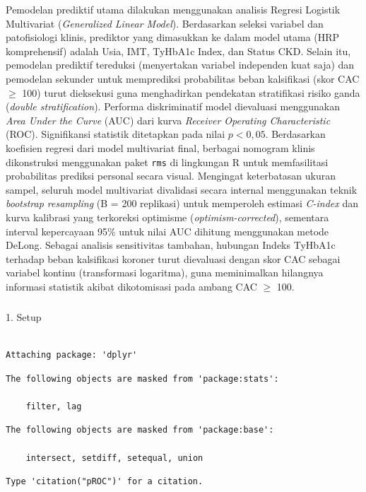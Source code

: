 \documentclass[
  indonesian,
]{agujournal2019}
\makeatletter
\let\oldsubparagraph\subparagraph
\renewcommand{\subparagraph}{
    \@ifstar
      \xxxSubParagraphStar
      \xxxSubParagraphNoStar
  }
\newcommand{\xxxSubParagraphStar}[1]{\oldsubparagraph*{#1}\mbox{}}
\newcommand{\xxxSubParagraphNoStar}[1]{\oldsubparagraph{#1}\mbox{}}
\makeatother
\begin{document}
Pemodelan prediktif utama dilakukan menggunakan analisis Regresi
Logistik Multivariat (\emph{Generalized Linear Model}). Berdasarkan
seleksi variabel dan patofisiologi klinis, prediktor yang dimasukkan ke
dalam model utama (HRP komprehensif) adalah Usia, IMT, TyHbA1c Index,
dan Status CKD. Selain itu, pemodelan prediktif tereduksi (menyertakan
variabel independen kuat saja) dan pemodelan sekunder untuk memprediksi
probabilitas beban kalsifikasi (skor CAC \(\ge\) 100) turut dieksekusi
guna menghadirkan pendekatan stratifikasi risiko ganda (\emph{double
stratification}). Performa diskriminatif model dievaluasi menggunakan
\emph{Area Under the Curve} (AUC) dari kurva \emph{Receiver Operating
Characteristic} (ROC). Signifikansi statistik ditetapkan pada nilai
\(p < 0,05\). Berdasarkan koefisien regresi dari model multivariat
final, berbagai nomogram klinis dikonstruksi menggunakan paket
\texttt{rms} di lingkungan R untuk memfasilitasi probabilitas prediksi
personal secara visual. Mengingat keterbatasan ukuran sampel, seluruh
model multivariat divalidasi secara internal menggunakan teknik
\emph{bootstrap resampling} (B = 200 replikasi) untuk memperoleh
estimasi \emph{C-index} dan kurva kalibrasi yang terkoreksi optimisme
(\emph{optimism-corrected}), sementara interval kepercayaan 95\% untuk
nilai AUC dihitung menggunakan metode DeLong. Sebagai analisis
sensitivitas tambahan, hubungan Indeks TyHbA1c terhadap beban
kalsifikasi koroner turut dievaluasi dengan skor CAC sebagai variabel
kontinu (transformasi logaritma), guna meminimalkan hilangnya informasi
statistik akibat dikotomisasi pada ambang CAC \(\ge\) 100.

\subparagraph{1. Setup}\label{setup}

\begin{verbatim}

Attaching package: 'dplyr'
\end{verbatim}

\begin{verbatim}
The following objects are masked from 'package:stats':

    filter, lag
\end{verbatim}

\begin{verbatim}
The following objects are masked from 'package:base':

    intersect, setdiff, setequal, union
\end{verbatim}

\begin{verbatim}
Type 'citation("pROC")' for a citation.
\end{verbatim}
\end{document}
